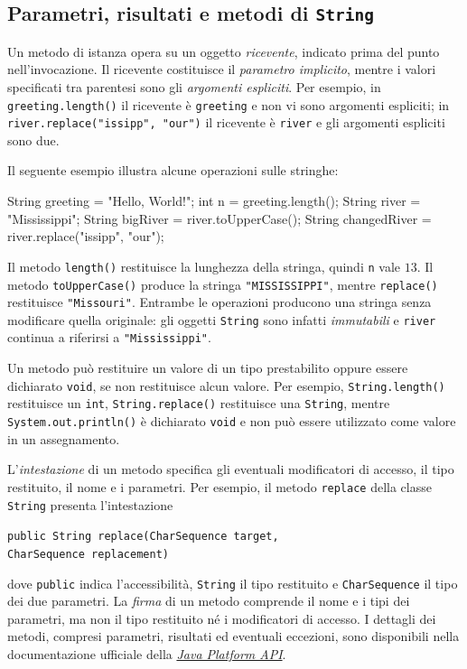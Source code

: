 \subsection{Parametri, risultati e metodi di \texttt{String}}
\label{sec:fi-java-metodi-string}

Un metodo di istanza opera su un oggetto \emph{ricevente},
indicato prima del punto nell'invocazione. Il ricevente
costituisce il \emph{parametro implicito}, mentre i valori
specificati tra parentesi sono gli \emph{argomenti espliciti}.
Per esempio, in \texttt{greeting.length()} il ricevente è
\texttt{greeting} e non vi sono argomenti espliciti; in
\texttt{river.replace("issipp", "our")} il ricevente è
\texttt{river} e gli argomenti espliciti sono due.

\begin{example}
Il seguente esempio illustra alcune operazioni sulle stringhe:
\begin{unipdcode}[language=Java]
String greeting = "Hello, World!";
int n = greeting.length();
String river = "Mississippi";
String bigRiver = river.toUpperCase();
String changedRiver = river.replace("issipp", "our");
\end{unipdcode}

Il metodo \texttt{length()} restituisce la lunghezza della
stringa, quindi \texttt{n} vale \(13\).
Il metodo \texttt{toUpperCase()} produce la stringa
\texttt{"MISSISSIPPI"}, mentre \texttt{replace()} restituisce
\texttt{"Missouri"}. Entrambe le operazioni producono una
stringa senza modificare quella originale: gli oggetti
\texttt{String} sono infatti \emph{immutabili} e
\texttt{river} continua a riferirsi a \texttt{"Mississippi"}.
\end{example}

Un metodo può restituire un valore di un tipo prestabilito
oppure essere dichiarato \texttt{void}, se non restituisce
alcun valore. Per esempio, \texttt{String.length()}
restituisce un \texttt{int}, \texttt{String.replace()}
restituisce una \texttt{String}, mentre
\texttt{System.out.println()} è dichiarato \texttt{void}
e non può essere utilizzato come valore in un assegnamento.

L'\emph{intestazione} di un metodo specifica gli eventuali
modificatori di accesso, il tipo restituito, il nome e i
parametri. Per esempio, il metodo \texttt{replace} della
classe \texttt{String} presenta l'intestazione
\begin{center}
  \texttt{public String replace(CharSequence target,}\\
  \texttt{CharSequence replacement)}
\end{center}
dove \texttt{public} indica l'accessibilità, \texttt{String}
il tipo restituito e \texttt{CharSequence} il tipo dei
due parametri. La \emph{firma} di un metodo comprende il
nome e i tipi dei parametri, ma non il tipo restituito né
i modificatori di accesso. I dettagli dei metodi, compresi
parametri, risultati ed eventuali eccezioni, sono disponibili
nella documentazione ufficiale della
\href{https://docs.oracle.com/en/java/javase/21/docs/api/index.html}
{\emph{Java Platform API}}.

